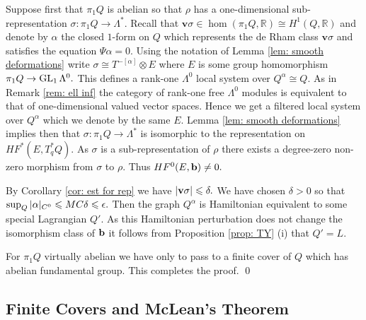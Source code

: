 \documentclass{article}
\theoremstyle{plain}%
\theoremstyle{definition}
\numberwithin{equation}{section}
\numberwithin{figure}{section}
\def\l{\label}
\def\GL{\mathop{\rm GL}}
\def\le{\leqslant\nobreak}
\def\R{{\mathbin{\mathbb R}}}
\def\al{\alpha}
\def\de{\delta}
\def\ep{\epsilon}
\def\si{\sigma}
\def\Ps{\Psi}
\def\La{\Lambda}
\def\v{{\mathbf{v}}}\def\cl{{\rm cl}}\def\alg{{\rm alg}}\def\geom{{\rm geom}}\def\loc{{\rm loc}}\def\dirlim{\displaystyle\varinjlim}
\begin{document}
Suppose first that $\pi_1Q$ is abelian so that $\rho$ has a one-dimensional sub-representation $\si:\pi_1Q\to \La^*.$ Recall that $\v\si\in \hom(\pi_1Q,\R)\cong H^1(Q,\R)$ and denote by $\al$ the closed $1$-form on $Q$ which represents the de Rham class $\v\si$ and satisfies the equation $\Ps\al=0.$ Using the notation of Lemma \ref{lem: smooth deformations} write $\si\cong T^{-[\al]}\otimes E$ where $E$ is some group homomorphism $\pi_1Q\to\GL_1\La^0.$ This defines a rank-one $\La^0$ local system over $Q^\al\cong Q.$ As in Remark \ref{rem: ell inf} the category of rank-one free $\La^0$ modules is equivalent to that of one-dimensional valued vector spaces. Hence we get a filtered local system over $Q^\al$ which we denote by the same $E.$ Lemma \ref{lem: smooth deformations} implies then that $\si:\pi_1Q\to\La^*$ is isomorphic to the representation on $HF^*(E,T_q^*Q).$ As $\si$ is a sub-representation of $\rho$ there exists a degree-zero non-zero morphism from $\si$ to $\rho.$ Thus $HF^0(E,{\mathbf{b}})\ne0.$

By Corollary \ref{cor: est for rep} we have $|\v\si|\le \de.$ We have chosen $\de>0$ so that $\sup_Q|\al|_{C^0}\le MC\de\le \ep.$ Then the graph $Q^\al$ is Hamiltonian equivalent to some special Lagrangian $Q'.$ As this Hamiltonian perturbation does not change the isomorphism class of ${\mathbf{b}}$ it follows from Proposition \ref{prop: TY} (i) that $Q'=L.$

For $\pi_1Q$ virtually abelian we have only to pass to a finite cover of $Q$ which has abelian fundamental group. This completes the proof.
\qed


\subsection{Finite Covers and McLean's Theorem}\l{sec: finite McLean}
\end{document}

